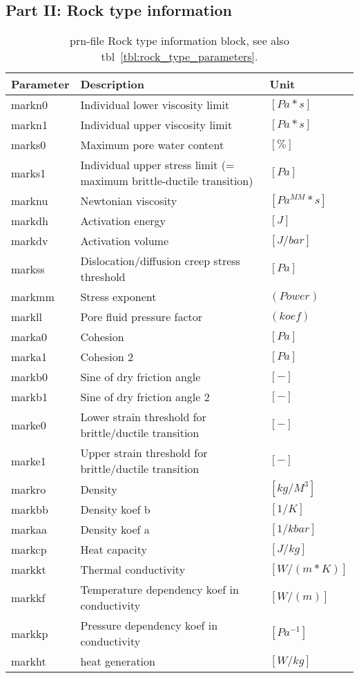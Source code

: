\subsection{Part II: Rock type information
}
\begin{table}[H]
\small
\centering
\begin{tabular}{l p{8cm} l}
\toprule
Parameter & Description & Unit\\
\midrule
markn0 & Individual lower viscosity limit & $[Pa*s]$ \\ 
markn1 & Individual upper viscosity limit & $[Pa*s]$ \\ 
marks0 & Maximum pore water content & $[\%]$ \\ 
marks1 & Individual upper stress limit (= maximum brittle-ductile transition) & $[Pa]$ \\ 
marknu & Newtonian viscosity & $[Pa^{MM}*s]$ \\ 
markdh & Activation energy & $[J]$\\ 
markdv & Activation volume & $[J/bar]$ \\ 
markss & Dislocation/diffusion creep stress threshold& $[Pa]$ \\ 
markmm & Stress exponent & $(Power)$ \\ 
markll & Pore fluid pressure factor & $(koef)$ \\ 
marka0 & Cohesion & $[Pa]$ \\
marka1 & Cohesion 2 & $[Pa]$ \\
markb0 & Sine of dry friction angle & $[-]$ \\
markb1 & Sine of dry friction angle 2 & $[-]$ \\
marke0 & Lower strain threshold for brittle/ductile transition & $[-]$ \\
marke1 & Upper strain threshold for brittle/ductile transition & $[-]$ \\ 
markro & Density & $[kg/M^3]$ \\ 
markbb & Density koef b & $[1/K]$ \\ 
markaa & Density koef a & $[1/kbar]$\\ 
markcp & Heat capacity  & $[J/kg]$ \\ 
markkt & Thermal conductivity & $[W/(m*K)]$ \\ 
markkf & Temperature dependency koef in conductivity & $[W/(m)]$ \\ 
markkp & Pressure dependency koef in conductivity & $[Pa^{-1}]$ \\ 
markht & heat generation & $[W/kg]$\\ 
\bottomrule
\end{tabular}
\caption{prn-file Rock type information block, see also tbl~\ref{tbl:rock_type_parameters}.}
\label{tbl:prn_rock_type_info}
\end{table}

